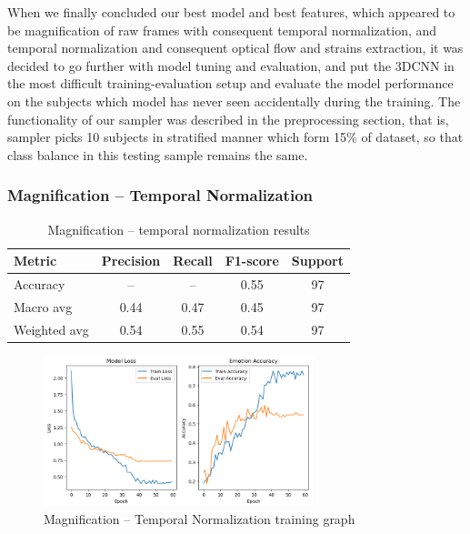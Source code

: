 \documentclass{article}
\begin{document}
When we finally concluded our best model and best features, which appeared to be magnification of raw frames with consequent temporal normalization, and temporal normalization and consequent optical flow and strains extraction, it was decided to go further with model tuning and evaluation, and put the 3DCNN in the most difficult training-evaluation setup and evaluate the model performance on the subjects which model has never seen accidentally during the training. The functionality of our sampler was described in the preprocessing section, that is, sampler picks 10 subjects in stratified manner which form 15\% of dataset, so that class balance in this testing sample remains the same.

\subsubsection{Magnification – Temporal Normalization}

\begin{table}[H]
\centering
\caption{Magnification – temporal normalization results}
\begin{tabular}{|l|c|c|c|c|}
\hline
\textbf{Metric} & \textbf{Precision} & \textbf{Recall} & \textbf{F1-score} & \textbf{Support} \\
\hline
Accuracy       & --   & --   & 0.55 & 97 \\
Macro avg      & 0.44 & 0.47 & 0.45 & 97 \\
Weighted avg   & 0.54 & 0.55 & 0.54 & 97 \\
\hline
\end{tabular}%
\label{tab:table10}
\end{table}

\begin{figure}[H]
  \begin{center}
    \includegraphics*[width=0.7\textwidth]{Figures/Picture14.png}
  \end{center}
  \caption{Magnification – Temporal Normalization training graph}
  \label{fig:fig14}
\end{figure}
\end{document}
